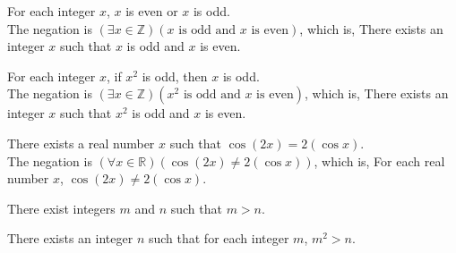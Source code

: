 \begin{list}{} 
\item \begin{list}{\bf{(c)}}
\item For each integer $x$, $x$ is even or $x$ is odd. \\
The negation is $\left( \exists x \in \mathbb{Z} \right) \left( x \text{ is odd and $x$ is even} \right)$, which is, There exists an integer $x$ such that $x$ is odd and $x$ is even.
\end{list}
\end{list}

\begin{list}{} 
\item \begin{list}{\bf{(e)}}
\item For each integer $x$, if $x^2$ is odd, then $x$ is odd. \\
The negation is $\left( \exists x \in \mathbb{Z} \right) \left( x^2 \text{ is odd and $x$ is even} \right)$, which is, There exists an integer $x$ such that $x^2$ is odd and $x$ is even.
\end{list}
\end{list}

\begin{list}{} 
\item \begin{list}{\bf{(h)}}
\item There exists a real number $x$ such that $\cos \left( 2x \right) = 2 \left( \cos x \right)$. \\
The negation is $\left( {\forall x \in \mathbb{R}} \right) \left( \cos \left( 2x \right) \ne 2 \left( \cos x \right) \right)$, which is, For each real number $x$, $\cos \left( 2x \right) \ne 2 \left( \cos x \right)$.
\end{list}
\end{list}

\vskip9pt
\begin{list}{\bf{\ref{exer:sec24-3}.}}
\item \begin{list}{\bf{(a)}}
\item There exist integers $m$ and $n$ such that $m > n$.
\end{list}
\end{list}
%
\begin{list}{}
\item \begin{list}{\bf{(e)}}
\item There exists an integer $n$ such that for each integer $m$, $m^2 > n$.
\end{list}
\end{list}

